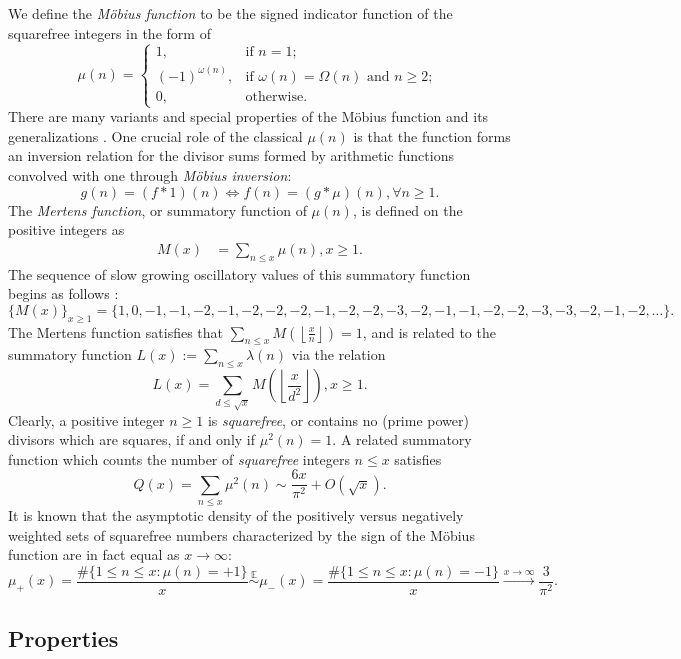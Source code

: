 \documentclass[11pt,reqno,a4letter]{article}
\numberwithin{figure}{section}
\numberwithin{table}{section}
\newcommand{\cf}{\textit{cf.\ }}
\newcommand{\seqnum}[1]{\href{http://oeis.org/#1}{\color{ProcessBlue}{\underline{#1}}}}
\newcommand{\Floor}[2]{\ensuremath{\left\lfloor \frac{#1}{#2} \right\rfloor}}
\theoremstyle{plain}
\numberwithin{theorem}{section}
\theoremstyle{definition}
\begin{document}
We define the \emph{M\"obius function} to be the signed indicator function 
of the squarefree integers in the form of \cite[\seqnum{A008683}]{OEIS} 
\[
\mu(n) = \begin{cases} 
     1, & \text{if $n = 1$; } \\ 
     (-1)^{\omega(n)}, & \text{if $\omega(n) = \Omega(n)$ and $n \geq 2$; } \\ 
     0, & \text{otherwise.} 
     \end{cases} 
\]
There are many variants and special properties of the M\"obius function 
and its generalizations \cite[\cf \S 2]{HANDBOOKNT-2004}. 
One crucial role of the classical $\mu(n)$ is that the function forms an inversion relation 
for the divisor sums formed by arithmetic functions convolved with one through \emph{M\"obius inversion}: 
\[
g(n) = (f \ast 1)(n) \iff f(n) = (g \ast \mu)(n), \forall n \geq 1. 
\]
The \emph{Mertens function}, or summatory function of $\mu(n)$, is defined on the 
positive integers as 
\begin{align*} 
M(x) & = \sum_{n \leq x} \mu(n), x \geq 1. 
\end{align*} 
The sequence of slow growing oscillatory values of this 
summatory function begins as follows \cite[\seqnum{A002321}]{OEIS}: 
\[
\{M(x)\}_{x \geq 1} = \{1, 0, -1, -1, -2, -1, -2, -2, -2, -1, -2, -2, -3, -2, 
     -1, -1, -2, -2, -3, -3, -2, -1, -2, \ldots\}. 
\] 
The Mertens function satisfies that $\sum_{n \leq x} M\left(\Floor{x}{n}\right) = 1$, and is related 
to the summatory function $L(x) := \sum_{n \leq x} \lambda(n)$ via the relation 
\cite{LEHMAN-1960} 
\[
L(x) = \sum_{d \leq \sqrt{x}} M\left(\Floor{x}{d^2}\right), x \geq 1. 
\]
Clearly, a positive integer $n \geq 1$ is \emph{squarefree}, or contains no (prime power) divisors which are 
squares, if and only if $\mu^2(n) = 1$. 
A related summatory function which counts the 
number of \emph{squarefree} integers $n \leq x$ satisfies 
\cite[\S 18.6]{HARDYWRIGHT} \cite[\seqnum{A013928}]{OEIS} 
\[ 
Q(x) = \sum_{n \leq x} \mu^2(n) \sim \frac{6x}{\pi^2} + O\left(\sqrt{x}\right). 
\] 
It is known that the asymptotic density of the positively versus negatively 
weighted sets of squarefree numbers characterized by the sign of the 
M\"obius function are in fact equal as $x \rightarrow \infty$: 
\[
\mu_{+}(x) = \frac{\#\{1 \leq n \leq x: \mu(n) = +1\}}{x} \overset{\mathbb{E}}{\sim} 
     \mu_{-}(x) = \frac{\#\{1 \leq n \leq x: \mu(n) = -1\}}{x} 
     \xrightarrow{x \rightarrow \infty} \frac{3}{\pi^2}. 
\]

\subsection{Properties} 
\end{document}
